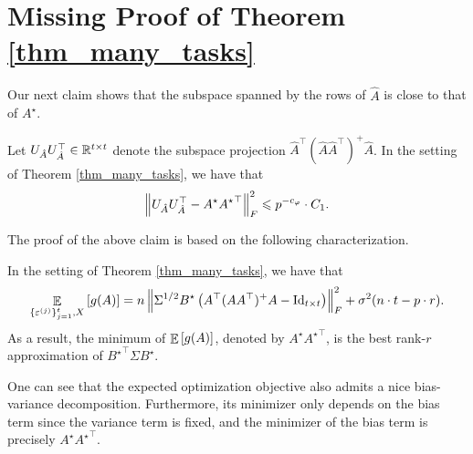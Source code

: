 \section{Missing Proof of Theorem \ref{thm_many_tasks}}\label{app_proof_error_same_cov}

	Our next claim shows that the subspace spanned by the rows of $\hat{A}$ is close to that of $A^{\star}$.
	\begin{claim}\label{claim_opt_dist}
		Let $U_{\hat{A}} U_{\hat{A}}^{\top} \in\mathbb{R}^{t\times t}$ denote the subspace projection $\hat{A}^{\top} (\hat{A}\hat{A}^{\top})^{+} \hat{A}$.
		In the setting of Theorem \ref{thm_many_tasks}, we have that
		\[ \left\| U_{\hat{A}} U_{\hat{A}}^{\top} - A^{\star} {A^{\star}}^{\top} \right\|_{F}^2
				\leqslant  p^{-c_{\varphi}} \cdot C_1. \]
	\end{claim}
	The proof of the above claim is based on the following characterization.

	\begin{claim}\label{lem_exp_opt}
		In the setting of Theorem \ref{thm_many_tasks}, we have that
		\begin{align}
			\mathop{\mathbb{E}}_{\{\varepsilon^{(j)}\}_{j=1}^t, X}\left[ g(A) \right] = n \left\| \Sigma^{1/2} B^{\star} \left({A^{\top} (AA^{\top})^{+} A - \operatorname{Id}_{t\times t}}\right) \right\|_{F}^2 + \sigma^2 (n\cdot t - p \cdot r). \label{eq_gA}
		\end{align}
		As a result, the minimum of $\mathop{\mathbb{E}}\left[ g(A) \right]$, denoted by $A^{\star}{A^\star}^\top$, is the best rank-$r$ approximation of ${B^{\star}}^{\top}\Sigma B^{\star}$.
	\end{claim}

	 One can see that the expected optimization objective also admits a nice bias-variance decomposition.
	Furthermore, its minimizer only depends on the bias term since the variance term is fixed, and the minimizer of the bias term is precisely $A^{\star} {A^{\star}}^{\top}$.

